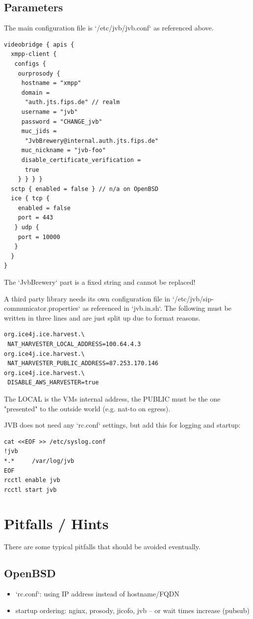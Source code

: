 \documentclass[conference]{IEEEtran}
\begin{document}
\subsection{Parameters}
The main configuration file is `/etc/jvb/jvb.conf` as referenced above.
\begin{verbatim}
videobridge { apis {
  xmpp-client {
   configs {
    ourprosody {
     hostname = "xmpp"
     domain = 
      "auth.jts.fips.de" // realm
     username = "jvb"
     password = "CHANGE_jvb"
     muc_jids = 
      "JvbBrewery@internal.auth.jts.fips.de"
     muc_nickname = "jvb-foo"
     disable_certificate_verification =
      true 
    } } } }
  sctp { enabled = false } // n/a on OpenBSD
  ice { tcp {
    enabled = false
    port = 443
   } udp {
    port = 10000
   }
  }
}
\end{verbatim}
The `JvbBrewery` part is a fixed string and cannot be replaced!

A third party library needs its own configuration file in `/etc/jvb/sip-communicator.properties`
as referenced in `jvb.in.sh`. The following must be written in three lines and are just
split up due to format reasons.
\begin{verbatim}
org.ice4j.ice.harvest.\
 NAT_HARVESTER_LOCAL_ADDRESS=100.64.4.3
org.ice4j.ice.harvest.\
 NAT_HARVESTER_PUBLIC_ADDRESS=87.253.170.146
org.ice4j.ice.harvest.\
 DISABLE_AWS_HARVESTER=true
\end{verbatim}
The LOCAL is the VMs internal address, the PUBLIC must be the one "presented" to the
outside world (e.g. nat-to on egress).

JVB does not need any `rc.conf` settings, but add this for logging and startup:
\begin{verbatim}
cat <<EOF >> /etc/syslog.conf
!jvb
*.*     /var/log/jvb
EOF
rcctl enable jvb
rcctl start jvb
\end{verbatim}

\section{Pitfalls / Hints}
There are some typical pitfalls that should be avoided eventually.
\subsection{OpenBSD}
\begin{itemize}
\item `rc.conf`: using IP address instead of hostname/FQDN
\item startup ordering: nginx, prosody, jicofo, jvb -- or wait times increase (pubsub)
\end{itemize}
\end{document}
